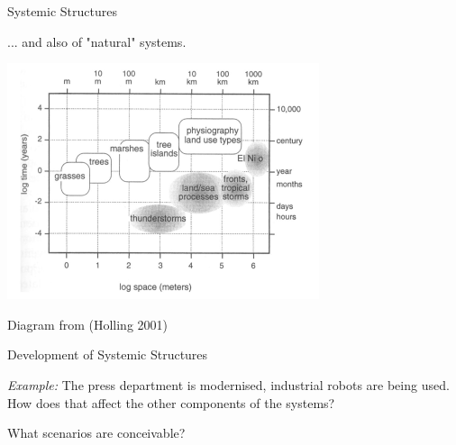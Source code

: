 \documentclass{beamer}
\begin{document}
\begin{frame}{Systemic Structures}

  ... and also of "natural" systems.
  \begin{center}
    \includegraphics[width=.7\textwidth]{Bilder/Holling-3.png}

    Diagram from (Holling 2001)
  \end{center}
\end{frame}

\begin{frame}{Development of Systemic Structures}

  \emph{Example:} The press department is modernised, industrial robots are
  being used.  How does that affect the other components of the systems?

  What scenarios are conceivable?

\end{frame}
\end{document}
